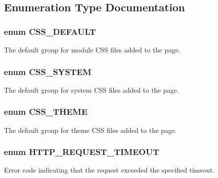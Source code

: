 \subsection{Enumeration Type Documentation}
\hypertarget{common_8inc_a6b8a843e5b9b3501472dc6efef34f36b}{
\subsubsection[{CSS\_\-DEFAULT}]{\setlength{\rightskip}{0pt plus 5cm}enum {\bf CSS\_\-DEFAULT}}}
\label{common_8inc_a6b8a843e5b9b3501472dc6efef34f36b}
The default group for module CSS files added to the page. \hypertarget{common_8inc_a4dcd70075399bbddb625fd93fa479e7f}{
\subsubsection[{CSS\_\-SYSTEM}]{\setlength{\rightskip}{0pt plus 5cm}enum {\bf CSS\_\-SYSTEM}}}
\label{common_8inc_a4dcd70075399bbddb625fd93fa479e7f}
The default group for system CSS files added to the page. \hypertarget{common_8inc_ad9e230079d79c5c4affbd4ce0b64b7d7}{
\subsubsection[{CSS\_\-THEME}]{\setlength{\rightskip}{0pt plus 5cm}enum {\bf CSS\_\-THEME}}}
\label{common_8inc_ad9e230079d79c5c4affbd4ce0b64b7d7}
The default group for theme CSS files added to the page. \hypertarget{common_8inc_a6b31bedd18943284b5b0c76022309167}{
\subsubsection[{HTTP\_\-REQUEST\_\-TIMEOUT}]{\setlength{\rightskip}{0pt plus 5cm}enum {\bf HTTP\_\-REQUEST\_\-TIMEOUT}}}
\label{common_8inc_a6b31bedd18943284b5b0c76022309167}
Error code indicating that the request exceeded the specified timeout.


